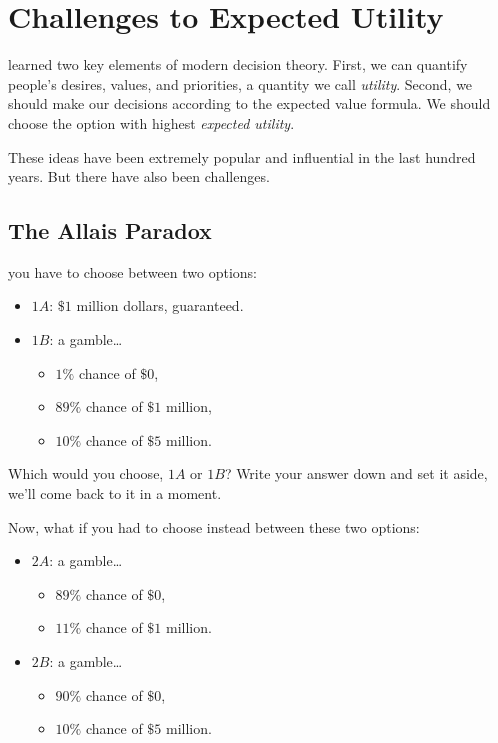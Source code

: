 \documentclass[justified]{tufte-book}
\providecommand{\tightlist}{%
  \setlength{\itemsep}{0pt}\setlength{\parskip}{0pt}}
\theoremstyle{definition}
\theoremstyle{definition}
\theoremstyle{definition}
\theoremstyle{remark}
\begin{document}
\hypertarget{challenges-to-expected-utility}{%
\chapter{Challenges to Expected Utility}\label{challenges-to-expected-utility}}

 learned two key elements of modern decision theory. First, we can quantify people's desires, values, and priorities, a quantity we call \emph{utility}. Second, we should make our decisions according to the expected value formula. We should choose the option with highest \emph{expected utility}.

These ideas have been extremely popular and influential in the last hundred years. But there have also been challenges.

\hypertarget{the-allais-paradox}{%
\section{The Allais Paradox}\label{the-allais-paradox}}

 you have to choose between two options:

\begin{itemize}
\tightlist
\item
  \(1A\): \(\$1\) million dollars, guaranteed.
\item
  \(1B\): a gamble\ldots{}

  \begin{itemize}
  \tightlist
  \item
    \(1\%\) chance of \(\$0\),
  \item
    \(89\%\) chance of \(\$1\) million,
  \item
    \(10\%\) chance of \(\$5\) million.
  \end{itemize}
\end{itemize}

Which would you choose, \(1A\) or \(1B\)? Write your answer down and set it aside, we'll come back to it in a moment.

Now, what if you had to choose instead between these two options:

\begin{itemize}
\tightlist
\item
  \(2A\): a gamble\ldots{}

  \begin{itemize}
  \tightlist
  \item
    \(89\%\) chance of \(\$0\),
  \item
    \(11\%\) chance of \(\$1\) million.
  \end{itemize}
\item
  \(2B\): a gamble\ldots{}

  \begin{itemize}
  \tightlist
  \item
    \(90\%\) chance of \(\$0\),
  \item
    \(10\%\) chance of \(\$5\) million.
  \end{itemize}
\end{itemize}
\end{document}

